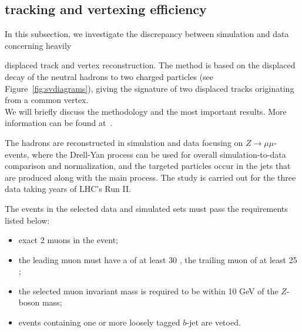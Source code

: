 \subsection{\Displ tracking and vertexing efficiency}
\label{sec:displacedvertex}

In this subsection, we investigate the discrepancy between simulation
and data concerning heavily

 displaced track and vertex
reconstruction. 
The method is based on the displaced decay of the
neutral hadrons \PKzS to two charged particles (see
Figure~\ref{fig:svdiagrams}), giving the signature of two displaced tracks
originating from a common vertex.\\
We will briefly discuss the methodology
and the most important results. More information can be found at~\cite{AN-20-111_KshortStudy}.

The \PKzS hadrons are reconstructed in simulation and data focusing on $Z\rightarrow \mu\mu$-events, where the Drell-Yan process can be used for overall simulation-to-data comparison and normalization, and the targeted particles occur in the jets that are produced along with the main process. The study is carried out for the three data taking years of LHC's Run II.

\noindent The events in the selected data and simulated sets must pass the requirements listed below:
\begin{itemize}
\setlength\itemsep{-0.2em}
    \item exact 2 muons in the event;
    \item the leading muon must have a \pt of at least 30 \GeV, the trailing muon of at least 25 \GeV;
    \item the selected muon invariant mass is required to be within 10 GeV of the $Z$-boson mass;
    \item events containing one or more loosely tagged $b$-jet are vetoed.
\end{itemize}

